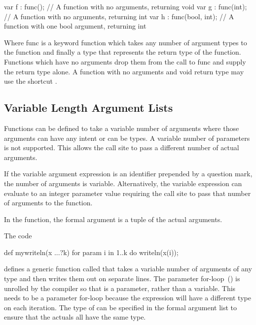 \begin{example}
\begin{chapel}
var f : func(); // A function with no arguments, returning void
var g : func(int); // A function with no arguments, returning int
var h : func(bool, int); // A function with one bool argument, returning int
\end{chapel}
\end{example}

Where func is a keyword function which takes any number of argument types to the function and finally a type that represents the return type of the function.  Functions which have no arguments drop them from the call to func and supply the return type alone.  A function with no arguments and void return type may use the shortcut .
                          
\subsection{Variable Length Argument Lists}
\label{Variable_Length_Argument_Lists}

Functions can be defined to take a variable number of arguments where
those arguments can have any intent or can be types.  A variable
number of parameters is not supported.  This allows the call site to
pass a different number of actual arguments.

If the variable argument expression is an identifier prepended by a
question mark, the number of arguments is variable.  Alternatively,
the variable expression can evaluate to an integer parameter value
requiring the call site to pass that number of arguments to the
function.

In the function, the formal argument is a tuple of the actual
arguments.

\begin{example}
The code
\begin{chapel}
def mywriteln(x ...?k) {
  for param i in 1..k do
    writeln(x(i));
}
\end{chapel}
defines a generic function called  that takes a
variable number of arguments of any type and then writes them out on
separate lines.  The parameter for-loop~()
is unrolled by the compiler so that  is a parameter, rather
than a variable.  This needs to be a parameter for-loop because the
expression  will have a different type on each iteration.
The type of  can be specified in the formal argument list to
ensure that the actuals all have the same type.
\end{example}

